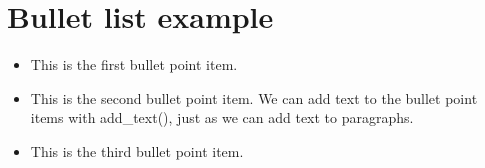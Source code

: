 \documentclass[a4paper]{report}
\begin{document}
\chapter{Bullet list example}
\begin{itemize}
\item This is the first bullet point item.
\item This is the second bullet point item. We can add text to the bullet point items with add\_text(), just as we can add text to paragraphs.
\item This is the third bullet point item.
\end{itemize}
\end{document}
